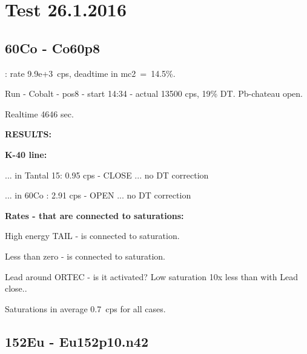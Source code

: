 \documentclass[12pt]{article}
\begin{document}
\section{Test 26.1.2016}

\subsection{ 60Co - Co60p8} : rate 9.9e+3~cps,   deadtime in mc2~=~14.5\%.

Run - Cobalt - pos8 - start 14:34 - actual 13500 cps, 19\% DT.  Pb-chateau open.

Realtime 4646 sec.

{\bf RESULTS: }
\begin{table}[!ht]
\end{table}

 
{\bf K-40  line:}

...  in Tantal 15: 0.95 cps - CLOSE ... no DT correction 

... in 60Co : 2.91 cps - OPEN ... no DT correction 


{\bf Rates - that are connected to saturations: }

High energy TAIL - is connected to saturation.

Less than zero -  is connected to saturation.

Lead around ORTEC - is it activated? Low saturation 10x less than with Lead close..



Saturations in average 0.7~cps for all cases.


\subsection{ 152Eu - Eu152p10.n42 }
\end{document}
